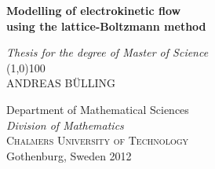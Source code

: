 \newpage
\clearpage
\thispagestyle{empty}

\mbox{}
\vspace{45pt}

\begin{center}
\LARGE \textbf{Modelling of electrokinetic flow\\ using the
  lattice-Boltzmann method} \normalsize

\vspace{8pt}
\emph{Thesis for the degree of Master of Science}\\
\vspace{10pt}
\line(1,0){100}\\
\vspace{16pt}
\large ANDREAS B\"{U}LLING
\end{center}
\vspace{365pt}

\begin{center}
\large Department of Mathematical Sciences \\
         \emph{Division of Mathematics} \\
	\textsc{Chalmers University of Technology} \\
	Gothenburg, Sweden 2012 \\
\end{center}
